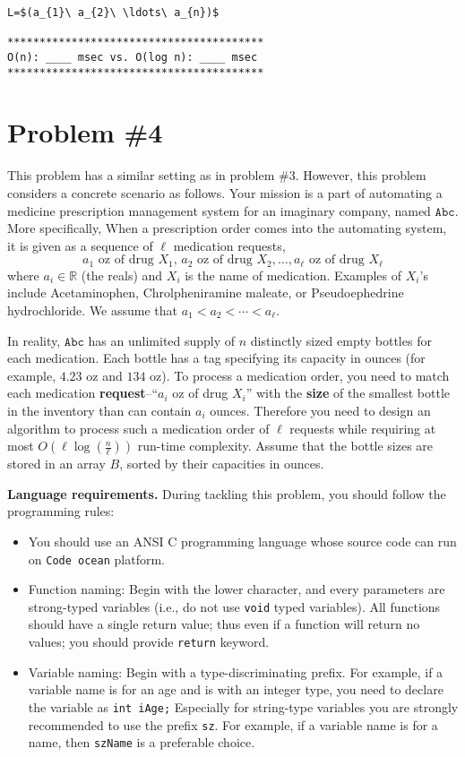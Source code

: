 \documentclass{article}
\newcommand{\R}{\mathbb{R}}
\begin{document}
\begin{lstlisting}[backgroundcolor=\color{yellow!40}]
L=$(a_{1}\ a_{2}\ \ldots\ a_{n})$

****************************************
O(n): ____ msec vs. O(log n): ____ msec
****************************************
\end{lstlisting}

% 
\newpage
\section*{Problem \#4} 

This problem has a similar setting as in problem \#3.
However, this problem considers a concrete scenario as follows.
Your mission is a part of automating a medicine prescription management system for 
an imaginary company, named $\mathtt{Abc}$. 
More specifically, When a prescription order comes into the automating system,
it is given as a sequence of $\ell$ medication requests,
\begin{equation*}
\text{$a_1$ oz of drug $X_1$, $a_2$ oz of drug $X_2$},\ldots,\text{$a_\ell$ oz of drug $X_\ell$}
\end{equation*}
where $a_i\in\R$ (the reals) and $X_i$ is the name of medication. Examples of $X_i$'s include Acetaminophen,
Chrolpheniramine maleate, or Pseudoephedrine hydrochloride. 
We assume that $a_1<a_2<\cdots <a_\ell$.


In reality, $\mathtt{Abc}$ has an unlimited supply of $n$ distinctly sized empty bottles for each medication.
Each bottle has a tag specifying its capacity in ounces (for example, $4.23$ oz and $134$ oz). 
To process a medication order, you need to match each medication \textbf{request}--``$a_i$ oz of drug $X_i$''
with the \textbf{size} of the smallest bottle in the inventory 
than can contain $a_i$ ounces.
Therefore you need to design an algorithm to process such a medication order of $\ell$ requests 
while requiring at most $O(\ell\log(\frac{n}{\ell}))$ run-time complexity.
Assume that the bottle sizes are stored in an array $B$, sorted by their capacities in ounces.

\bigskip
\noindent\textbf{Language requirements. }%
During tackling this problem, you should follow the programming rules:
\begin{itemize}
\item You should use an ANSI C programming language whose source code can run on \texttt{Code ocean} platform. 
\item Function naming: Begin with the lower character, and every parameters are strong-typed variables (i.e., do not use \texttt{void} typed variables).
	All functions should have a single return value; thus even if a function will return no values; you should provide \texttt{return} keyword.
\item Variable naming: Begin with a type-discriminating prefix. For example, if a variable name is for an age and is with an integer type,
	you need to declare the variable as \texttt{int iAge;}  Especially for string-type variables you are strongly recommended to use the prefix \texttt{sz}.
	For example, if a variable name is for a name, then \texttt{szName} is a preferable choice.
\end{itemize}
\end{document}
